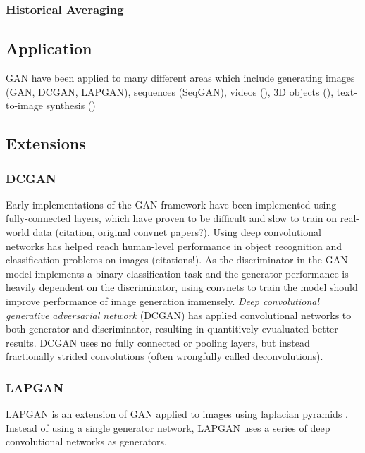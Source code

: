 \subsubsection{Historical Averaging}
\label{ssub:gan_historical_averaging}




\subsection{Application}
\label{sub:gan_application}
GAN have been applied to many different areas which include generating images (GAN, DCGAN, LAPGAN), sequences (SeqGAN), videos (\cite{gan_video:2016}), 3D objects (\cite{gan_3d:2016}), text-to-image synthesis (\cite{gan_t2i:2016})


\subsection{Extensions}
\label{sub:gan_extensions}

\subsubsection{DCGAN \cite{dcgan:2015}}
\label{ssub:dcgan}
Early implementations of the GAN framework have been implemented using fully-connected layers,
which have proven to be difficult and slow to train on real-world data (citation, original convnet papers?).
Using deep convolutional networks has helped reach human-level performance in object recognition and classification problems on images (citations!).
As the discriminator in the GAN model implements a binary classification task and the generator performance is heavily dependent on the discriminator, using convnets to train the model should improve performance of image generation immensely.
\emph{Deep convolutional generative adversarial network} (DCGAN) has applied convolutional networks to both generator and discriminator, resulting in quantitively evualuated better results.
DCGAN uses no fully connected or pooling layers, but instead fractionally strided convolutions (often wrongfully called deconvolutions).

\subsubsection{LAPGAN \cite{lapgan:2015}}
\label{ssub:lapgan}
LAPGAN is an extension of GAN applied to images using laplacian pyramids \cite{laplacian:1983}.
Instead of using a single generator network, LAPGAN uses a series of deep convolutional networks as generators.

